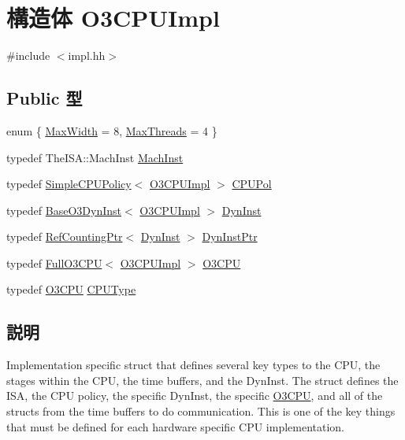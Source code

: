 \hypertarget{structO3CPUImpl}{
\section{構造体 O3CPUImpl}
\label{structO3CPUImpl}
}


{\ttfamily \#include $<$impl.hh$>$}\subsection*{Public 型}
\begin{DoxyCompactItemize}
\item 
enum \{ \hyperlink{structO3CPUImpl_a96a58e29e8dbf2b5bdeb775cba46556eaccb4dfe1c6060f0571b5d9685f402134}{MaxWidth} =  8, 
\hyperlink{structO3CPUImpl_a96a58e29e8dbf2b5bdeb775cba46556eab491ddc45d51d0ea7f735c1926390fdb}{MaxThreads} =  4
 \}
\item 
typedef TheISA::MachInst \hyperlink{structO3CPUImpl_a4617f528417b8f55f809ae0988284c9b}{MachInst}
\item 
typedef \hyperlink{structSimpleCPUPolicy}{SimpleCPUPolicy}$<$ \hyperlink{structO3CPUImpl}{O3CPUImpl} $>$ \hyperlink{structO3CPUImpl_aeba254ee40fcbe18afbc0d55cb4df61e}{CPUPol}
\item 
typedef \hyperlink{classBaseO3DynInst}{BaseO3DynInst}$<$ \hyperlink{structO3CPUImpl}{O3CPUImpl} $>$ \hyperlink{structO3CPUImpl_a2b06f471018e9b0b8e4b3785af475b2d}{DynInst}
\item 
typedef \hyperlink{classRefCountingPtr}{RefCountingPtr}$<$ \hyperlink{classBaseO3DynInst}{DynInst} $>$ \hyperlink{structO3CPUImpl_a97c1adaf6da40f1dd1f86fe0b3b51249}{DynInstPtr}
\item 
typedef \hyperlink{classFullO3CPU}{FullO3CPU}$<$ \hyperlink{structO3CPUImpl}{O3CPUImpl} $>$ \hyperlink{structO3CPUImpl_ae2d319b803b8c735fdf7908491224280}{O3CPU}
\item 
typedef \hyperlink{classFullO3CPU}{O3CPU} \hyperlink{structO3CPUImpl_a3ba7f2725c642bed7818c4cef75aa9f2}{CPUType}
\end{DoxyCompactItemize}


\subsection{説明}
Implementation specific struct that defines several key types to the CPU, the stages within the CPU, the time buffers, and the DynInst. The struct defines the ISA, the CPU policy, the specific DynInst, the specific \hyperlink{namespaceO3CPU}{O3CPU}, and all of the structs from the time buffers to do communication. This is one of the key things that must be defined for each hardware specific CPU implementation. 

